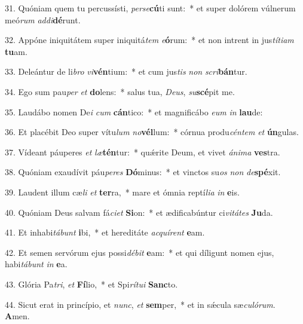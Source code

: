 31. Quóniam quem tu percussísti, \textit{per}\textit{se}\textbf{cú}ti sunt:~*  et super dolórem vúlnerum meó\textit{rum} \textit{ad}\textit{di}\textbf{dé}runt.\

32. Appóne iniquitátem super iniquitá\textit{tem} \textit{e}\textbf{ó}rum:~*  et non intrent in jus\textit{tí}\textit{ti}\textit{am} \textbf{tu}am.\

33. Deleántur de li\textit{bro} \textit{vi}\textbf{vén}tium:~*  et cum jus\textit{tis} \textit{non} \textit{scri}\textbf{bán}tur.\

34. Ego sum pau\textit{per} \textit{et} \textbf{do}lens:~*  salus tua, \textit{De}\textit{us}, \textit{su}\textbf{scé}pit me.\

35. Laudábo nomen De\textit{i} \textit{cum} \textbf{cán}tico:~*  et magnificábo \textit{e}\textit{um} \textit{in} \textbf{lau}de:\

36. Et placébit Deo super vítu\textit{lum} \textit{no}\textbf{vél}lum:~*  córnua produ\textit{cén}\textit{tem} \textit{et} \textbf{ún}gulas.\

37. Vídeant páuperes \textit{et} \textit{læ}\textbf{tén}tur:~*  quǽrite Deum, et vivet \textit{á}\textit{ni}\textit{ma} \textbf{ves}tra.\

38. Quóniam exaudívit páu\textit{pe}\textit{res} \textbf{Dó}minus:~*  et vinctos su\textit{os} \textit{non} \textit{de}\textbf{spé}xit.\

39. Laudent illum cæ\textit{li} \textit{et} \textbf{ter}ra,~*  mare et ómnia reptí\textit{li}\textit{a} \textit{in} \textbf{e}is.\

40. Quóniam Deus salvam fá\textit{ci}\textit{et} \textbf{Si}on:~*  et ædificabúntur ci\textit{vi}\textit{tá}\textit{tes} \textbf{Ju}da.\

41. Et inhabi\textit{tá}\textit{bunt} \textbf{i}bi,~*  et hereditáte \textit{ac}\textit{quí}\textit{rent} \textbf{e}am.\

42. Et semen servórum ejus possi\textit{dé}\textit{bit} \textbf{e}am:~*  et qui díligunt nomen ejus, habi\textit{tá}\textit{bunt} \textit{in} \textbf{e}a.\

43. Glória Pa\textit{tri}, \textit{et} \textbf{Fí}lio,~*  et Spi\textit{rí}\textit{tu}\textit{i} \textbf{Sanc}to.\

44. Sicut erat in princípio, et \textit{nunc}, \textit{et} \textbf{sem}per,~*  et in sǽcula sæ\textit{cu}\textit{ló}\textit{rum}. \textbf{A}men.\

